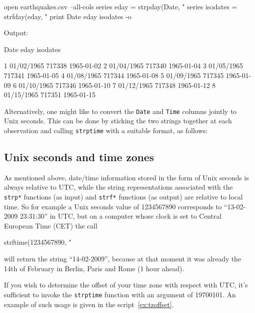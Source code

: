 \begin{script}[htbp]
  \label{ex:earthquakes}
\begin{scodebit}
open earthquakes.csv --all-cols
series eday = strpday(Date, "%
series isodates = strfday(eday, "%
print Date eday isodates -o
\end{scodebit}
  
Output:
\begin{outbit}
          Date         eday     isodates

1   01/02/1965       717338   1965-01-02
2   01/04/1965       717340   1965-01-04
3   01/05/1965       717341   1965-01-05
4   01/08/1965       717344   1965-01-08
5   01/09/1965       717345   1965-01-09
6   01/10/1965       717346   1965-01-10
7   01/12/1965       717348   1965-01-12
8   01/15/1965       717351   1965-01-15
\end{outbit}
\end{script}

Alternatively, one might like to convert the \texttt{Date} and
\texttt{Time} columns jointly to Unix seconds. This can be done by
sticking the two strings together at each observation and calling
\texttt{strptime} with a suitable format, as follows:
%

\subsection{Unix seconds and time zones}

As mentioned above, date/time information stored in the form of Unix
seconds is always relative to UTC, while the string representations
associated with the \texttt{strp*} functions (as input) and
\texttt{strf*} functions (as output) are relative to local time. So
for example a Unix seconds value of 1234567890 corresponds to
``13-02-2009 23:31:30'' in UTC, but on a computer whose clock is set
to Central European Time (CET) the call
\begin{code}
  strftime(1234567890, "%
\end{code}
will return the string ``14-02-2009'', because at that moment it was
already the 14th of February in Berlin, Paris and Rome (1 hour ahead).

If you wish to determine the offset of your time zone with respect
with UTC, it's sufficient to invoke the \texttt{strptime} function
with an argument of 19700101.  An example of such usage is given in
the script~\ref{ex:tzoffset}.

